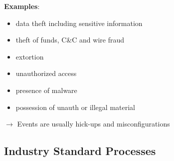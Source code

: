 \textbf{Examples}:
\begin{itemize}
    \item data theft including sensitive information
    \item theft of funds, C\&C and wire fraud
    \item extortion
    \item unauthorized access
    \item presence of malware
    \item possession of unauth or illegal material\\
\end{itemize}
$\rightarrow$ Events are usually hick-ups and misconfigurations

\subsection{Industry Standard Processes}
